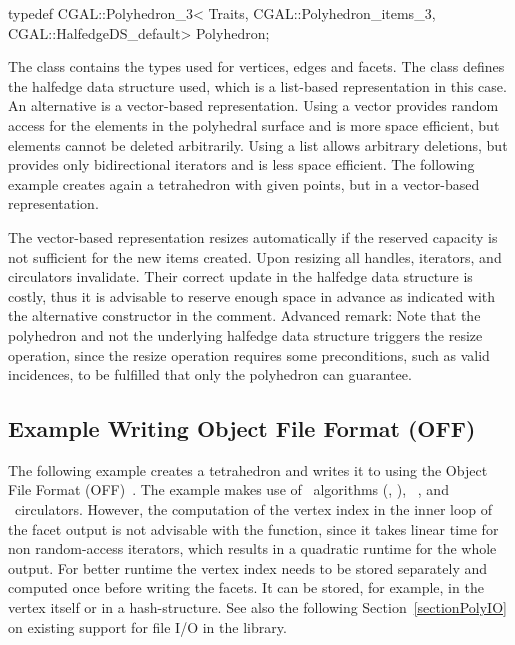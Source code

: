 \begin{ccExampleCode}
typedef CGAL::Polyhedron_3< Traits, 
                            CGAL::Polyhedron_items_3, 
                            CGAL::HalfedgeDS_default>      Polyhedron;
\end{ccExampleCode}

The  class contains the types used for
vertices, edges and facets. The  class
defines the halfedge data structure used, which is a list-based
representation in this case. An alternative is a vector-based
representation. Using a vector provides random
access for the elements in the polyhedral surface and is more space
efficient, but elements cannot be deleted arbitrarily. Using a list
allows arbitrary deletions, but provides only bidirectional iterators
and is less space efficient. The following example creates again a 
tetrahedron with given points, but in a vector-based representation.

The vector-based representation resizes automatically if the reserved
capacity is not sufficient for the new items created. Upon resizing
all handles, iterators, and circulators invalidate. Their correct
update in the halfedge data structure is costly, thus it is advisable
to reserve enough space in advance as indicated with the alternative
constructor in the comment. Advanced remark: Note that the polyhedron
and not the underlying halfedge data structure triggers the resize
operation, since the resize operation requires some preconditions,
such as valid incidences, to be fulfilled that only the polyhedron can
guarantee.



\subsection{Example Writing Object File Format (OFF)}

The following example creates a tetrahedron and writes it to
 using the Object File Format (OFF)~\cite{p-gmgv15-94}.  The
example makes use of \stl\ algorithms (, ),
\stl\ , and \cgal\ circulators.  However, the
computation of the vertex index in the inner loop of the facet output
is not advisable with the  function, since it takes
linear time for non random-access iterators, which results in a
quadratic runtime for the whole output. For better runtime the vertex
index needs to be stored separately and computed once before writing
the facets. It can be stored, for example, in the vertex itself or in
a hash-structure.  See also the following Section~\ref{sectionPolyIO}
on existing support for file I/O in the library.

